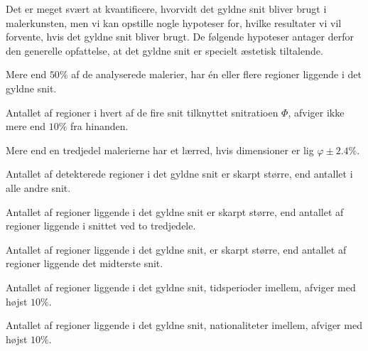 {
{\sffamily Det er meget svært at kvantificere, hvorvidt det gyldne snit
bliver brugt i malerkunsten, men vi kan opstille nogle hypoteser for,
hvilke resultater vi vil forvente, hvis det gyldne snit bliver brugt.
De følgende hypoteser antager derfor den generelle opfattelse, at det
gyldne snit er specielt æstetisk tiltalende.
}

\begin{hypotese}
    Mere end $50\%$ af de analyserede malerier, har én eller flere
    regioner liggende i det gyldne snit.
    \label{hypo_binaer}
\end{hypotese}

\begin{hypotese}
    Antallet af regioner i hvert af de fire snit tilknyttet snitratioen
    $\varPhi$, afviger ikke mere end $10\%$ fra hinanden.
    \label{hypo_fire_g_snit}
\end{hypotese}

\begin{hypotese}
    Mere end en tredjedel malerierne har et lærred, hvis
    dimensioner er lig $\varphi\pm2.4\%$.
    \label{hypo_golden_ractangle}
\end{hypotese}

\begin{hypotese}
    Antallet af detekterede regioner i det gyldne snit er skarpt
    større, end antallet i alle andre snit.
    \label{hypo_alle_andre_snit}
\end{hypotese}

\begin{hypotese}
    Antallet af regioner liggende i det gyldne snit er skarpt større, end
    antallet af regioner liggende i snittet ved to tredjedele.
    \label{hypo_to_tredjedele}
\end{hypotese}

\begin{hypotese}
    Antallet af regioner liggende i det gyldne snit, er skarpt større, end
    antallet af regioner liggende det midterste snit.
    \label{hypo_midten}
\end{hypotese}

\begin{hypotese}
    Antallet af regioner liggende i det gyldne snit, tidsperioder
    imellem, afviger med højst $10\%$.
    \label{hypo_tid}
\end{hypotese}

\begin{hypotese}
    Antallet af regioner liggende i det gyldne snit, nationaliteter
    imellem, afviger med højst $10\%$.
    \label{hypo_nation}
\end{hypotese}

}
